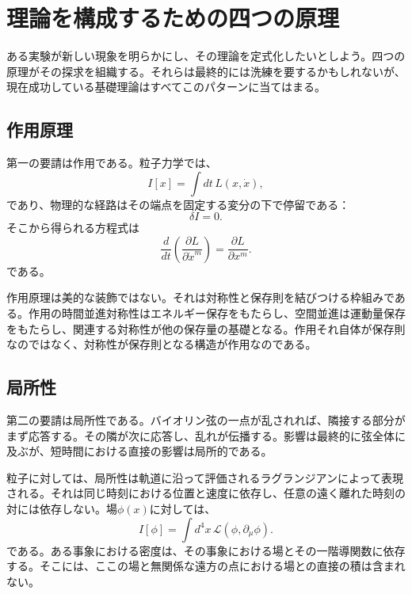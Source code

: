 \section{理論を構成するための四つの原理}

ある実験が新しい現象を明らかにし、その理論を定式化したいとしよう。四つの原理がその探求を組織する。それらは最終的には洗練を要するかもしれないが、現在成功している基礎理論はすべてこのパターンに当てはまる。

\subsection{作用原理}

第一の要請は作用である。粒子力学では、
\begin{equation}
I[x]
=
\int dt\,L(x,\dot x),
\label{eq:sr7-particle-action-general}
\end{equation}
であり、物理的な経路はその端点を固定する変分の下で停留である：
\begin{equation}
\delta I=0.
\end{equation}
そこから得られる方程式は
\begin{equation}
\frac{d}{dt}
\left(
\frac{\partial L}{\partial\dot x^m}
\right)
=
\frac{\partial L}{\partial x^m}.
\label{eq:sr7-EL}
\end{equation}
である。

作用原理は美的な装飾ではない。それは対称性と保存則を結びつける枠組みである。作用の時間並進対称性はエネルギー保存をもたらし、空間並進は運動量保存をもたらし、関連する対称性が他の保存量の基礎となる。作用それ自体が保存則なのではなく、対称性が保存則となる構造が作用なのである。

\subsection{局所性}

第二の要請は局所性である。バイオリン弦の一点が乱されれば、隣接する部分がまず応答する。その隣が次に応答し、乱れが伝播する。影響は最終的に弦全体に及ぶが、短時間における直接の影響は局所的である。

粒子に対しては、局所性は軌道に沿って評価されるラグランジアンによって表現される。それは同じ時刻における位置と速度に依存し、任意の遠く離れた時刻の対には依存しない。場\(\phi(x)\)に対しては、
\begin{equation}
I[\phi]
=
\int d^4x\,
\mathcal L\!\left(\phi,\partial_\mu\phi\right).
\label{eq:sr7-local-field-action}
\end{equation}
である。ある事象における密度は、その事象における場とその一階導関数に依存する。そこには、ここの場と無関係な遠方の点における場との直接の積は含まれない。

